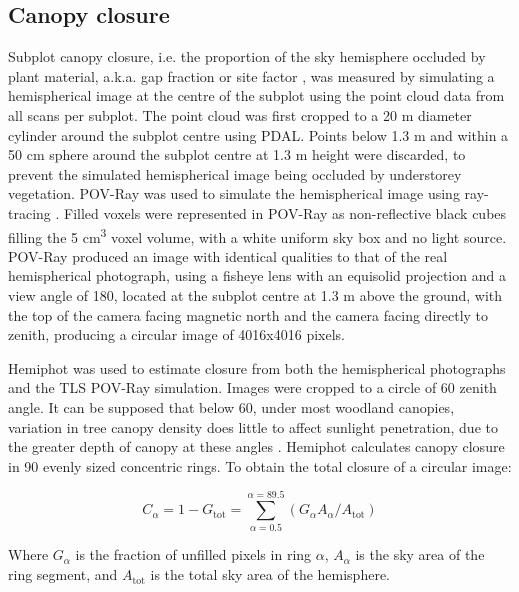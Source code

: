 \documentclass[11pt,a4paper]{article}
\begin{document}
\subsection{Canopy closure}

Subplot canopy closure, i.e. the proportion of the sky hemisphere occluded by plant material, a.k.a. gap fraction or site factor \citep{Jennings1999}, was measured by simulating a hemispherical image at the centre of the subplot using the point cloud data from all scans per subplot. The point cloud was first cropped to a 20 m diameter cylinder around the subplot centre using PDAL. Points below 1.3 m and within a 50 cm sphere around the subplot centre at 1.3 m height were discarded, to prevent the simulated hemispherical image being occluded by understorey vegetation. POV-Ray was used to simulate the hemispherical image using ray-tracing \citep{Povray2004}. Filled voxels were represented in POV-Ray as non-reflective black cubes filling the 5 cm\textsuperscript{3} voxel volume, with a white uniform sky box and no light source. POV-Ray produced an image with identical qualities to that of the real hemispherical photograph, using a fisheye lens with an equisolid projection and a view angle of 180\textdegree, located at the subplot centre at 1.3 m above the ground, with the top of the camera facing magnetic north and the camera facing directly to zenith, producing a circular image of 4016x4016 pixels.

Hemiphot \citep{HemiPhot} was used to estimate closure from both the hemispherical photographs and the TLS POV-Ray simulation. Images were cropped to a circle of 60\textdegree{} zenith angle. It can be supposed that below 60\textdegree{}, under most woodland canopies, variation in tree canopy density does little to affect sunlight penetration, due to the greater depth of canopy at these angles \citep{Jupp2008}. Hemiphot calculates canopy closure in 90 evenly sized concentric rings. To obtain the total closure of a circular image:

\begin{equation}
	C_{\alpha{}} = 1 - G_{\text{tot}} = \sum_{\alpha{} = 0.5}^{\alpha{} = 89.5}(G_{\alpha{}} A_{\alpha{}} / A_{\text{tot}})
\end{equation}

Where $G_{\alpha{}}$ is the fraction of unfilled pixels in ring $\alpha{}$, $A_{\alpha{}}$ is the sky area of the ring segment, and $A_{\text{tot}}$ is the total sky area of the hemisphere.
\end{document}
